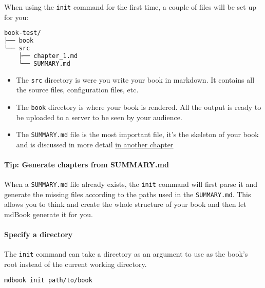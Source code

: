 \documentclass{article}
\begin{document}
When using the \lstinline|init| command for the first time, a couple of files will be set
up for you:\\
\begin{lstlisting}[language=bash]
book-test/
├── book
└── src
    ├── chapter_1.md
    └── SUMMARY.md

\end{lstlisting}
\begin{itemize}
\item 
The \lstinline|src| directory is were you write your book in markdown. It contains all
the source files, configuration files, etc.\\

\item 
The \lstinline|book| directory is where your book is rendered. All the output is ready
to be uploaded to a server to be seen by your audience.\\

\item 
The \lstinline|SUMMARY.md| file is the most important file, it's the skeleton of your
book and is discussed in more detail \hyperref[SUMMARY.md]{in another
chapter}\\

\end{itemize}

\paragraph{Tip: Generate chapters from SUMMARY.md}
\label{Tip: Generate chapters from SUMMARY.md}
\label{tip-generate-chapters-from-summary-md}

When a \lstinline|SUMMARY.md| file already exists, the \lstinline|init| command will first parse it
and generate the missing files according to the paths used in the \lstinline|SUMMARY.md|.
This allows you to think and create the whole structure of your book and then
let mdBook generate it for you.\\

\paragraph{Specify a directory}
\label{Specify a directory}
\label{specify-a-directory}

The \lstinline|init| command can take a directory as an argument to use as the book's root
instead of the current working directory.\\
\begin{lstlisting}[language=bash]
mdbook init path/to/book

\end{lstlisting}
\end{document}
